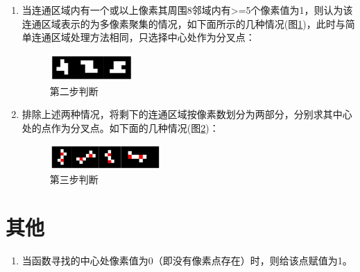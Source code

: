 \documentclass[12pt]{article}
\begin{document}
\begin{enumerate}
\begin{enumerate}
\begin{enumerate}
\item 当连通区域内有一个或以上像素其周围8邻域内有>=5个像素值为1，则认为该连通区域表示的为多像素聚集的情况，如下面所示的几种情况(图\ref{fig:complex3})，此时与简单连通区域处理方法相同，只选择中心处作为分叉点：
\begin{figure}[ht!]
\centering
\includegraphics[width=0.3\textwidth]{images/complex3}
\caption{第二步判断}
\label{fig:complex3}
\end{figure}
\item 排除上述两种情况，将剩下的连通区域按像素数划分为两部分，分别求其中心处的点作为分叉点。如下面的几种情况(图\ref{fig:complex4})：
\begin{figure}[ht!]
\centering
\includegraphics[width=0.4\textwidth]{images/complex4}
\caption{第三步判断}
\label{fig:complex4}
\end{figure}
\end{enumerate}
\end{enumerate}
\end{enumerate}

\section{其他}
\begin{enumerate}
\item 当函数寻找的中心处像素值为0（即没有像素点存在）时，则给该点赋值为1。
\end{enumerate}
\end{document}
